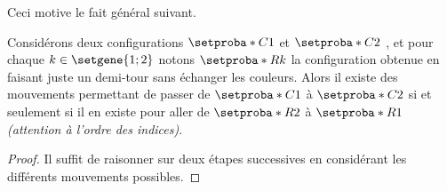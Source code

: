 Ceci motive le fait général suivant.


\begin{fact} \label{symmetry-no-color}
    Considérons deux configurations $\setproba*{C}{1}$ et $\setproba*{C}{2}$ , et pour chaque $k \in \setgene{1 ; 2}$ notons $\setproba*{R}{k}$ la configuration obtenue en faisant juste un demi-tour sans échanger les couleurs.
    Alors il existe des mouvements permettant de passer de $\setproba*{C}{1}$ à $\setproba*{C}{2}$ si et seulement si il en existe pour aller de $\setproba*{R}{2}$ à $\setproba*{R}{1}$ \emph{(attention à l'ordre des indices)}.
\end{fact}


\begin{proof}
    Il suffit de raisonner sur deux étapes successives en considérant les différents mouvements possibles.
\end{proof}
